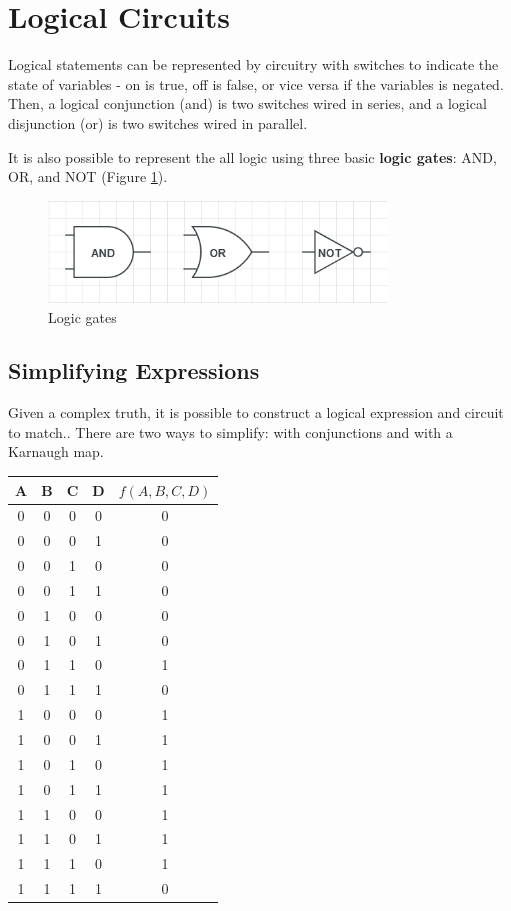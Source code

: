 \documentclass[11pt]{article}
\begin{document}
\section{Logical Circuits}
	Logical statements can be represented by circuitry with switches to indicate the state of variables - on is true, off is false, or vice versa if the variables is negated. Then, a logical conjunction (and) is two switches wired in series, and a logical disjunction (or) is two switches wired in parallel.
	
	It is also possible to represent the all logic using three basic \textbf{logic gates}: AND, OR, and NOT (Figure \ref{fig:logicgate}).
	
	\begin{figure}[htb]
		\centering
		\includegraphics[width=0.8\textwidth]{logicgates.png}
		\caption{Logic gates}
		\label{fig:logicgate}
	\end{figure}	
	
	\subsection{Simplifying Expressions}
		Given a complex truth, it is possible to construct a logical expression and circuit to match.. There are two ways to simplify: with conjunctions and with a Karnaugh map.
		\begin{center}
		\begin{tabular}{cccc|c}\label{truthtab}
			A&B&C&D&$f(A,B,C,D)$\\\hline
			0&0&0&0&0\\
			0&0&0&1&0\\
			0&0&1&0&0\\
			0&0&1&1&0\\
			0&1&0&0&0\\
			0&1&0&1&0\\
			0&1&1&0&1\\
			0&1&1&1&0\\
			1&0&0&0&1\\
			1&0&0&1&1\\
			1&0&1&0&1\\
			1&0&1&1&1\\
			1&1&0&0&1\\
			1&1&0&1&1\\
			1&1&1&0&1\\
			1&1&1&1&0
		\end{tabular}
		\end{center}
	
\end{document}
